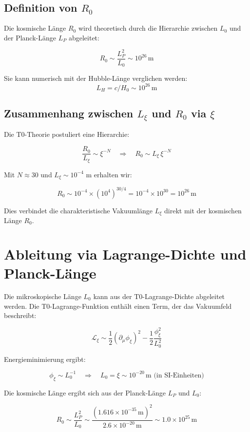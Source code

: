 \documentclass[12pt,a4paper]{article}
\numberwithin{equation}{section}
\begin{document}
	\subsection{Definition von $R_0$}
	
	Die kosmische Länge $R_0$ wird theoretisch durch die Hierarchie zwischen $L_0$ und der Planck-Länge $L_P$ abgeleitet:
	
	\[
	R_0 \sim \frac{L_P^2}{L_0} \sim 10^{26}\,\text{m}
	\]
	
	Sie kann numerisch mit der Hubble-Länge verglichen werden:
	\[
	L_H = c / H_0 \sim 10^{26}\,\text{m}
	\]
	
	\subsection{Zusammenhang zwischen $L_\xi$ und $R_0$ via $\xi$}
	
	Die T0-Theorie postuliert eine Hierarchie:
	
	\[
	\frac{R_0}{L_\xi} \sim \xi^{-N} \quad \Rightarrow \quad R_0 \sim L_\xi \, \xi^{-N}
	\]
	
	Mit $N \approx 30$ und $L_\xi \sim 10^{-4}$ m erhalten wir:
	
	\[
	R_0 \sim 10^{-4} \times (10^4)^{30/4} = 10^{-4} \times 10^{30} = 10^{26}\,\text{m}
	\]
	
	Dies verbindet die charakteristische Vakuumlänge $L_\xi$ direkt mit der kosmischen Länge $R_0$.
	
	\section{Ableitung via Lagrange-Dichte und Planck-Länge}
	
	Die mikroskopische Länge $L_0$ kann aus der T0-Lagrange-Dichte abgeleitet werden. Die T0-Lagrange-Funktion enthält einen Term, der das Vakuumfeld beschreibt:
	
	\[
	\mathcal{L}_{\xi} \sim \frac{1}{2} (\partial_\mu \phi_\xi)^2 - \frac{1}{2} \frac{\phi_\xi^2}{L_0^2}
	\]
	
	Energieminimierung ergibt:
	
	\[
	\phi_\xi \sim L_0^{-1} \quad \Rightarrow \quad L_0 = \xi \sim 10^{-20}\,\text{m (in SI-Einheiten)}
	\]
	
	Die kosmische Länge ergibt sich aus der Planck-Länge $L_P$ und $L_0$:
	
	\[
	R_0 \sim \frac{L_P^2}{L_0} \sim \frac{(1.616 \times 10^{-35}\,\text{m})^2}{2.6 \times 10^{-20}\,\text{m}} \sim 1.0 \times 10^{25}\,\text{m}
	\]
	
\end{document}
